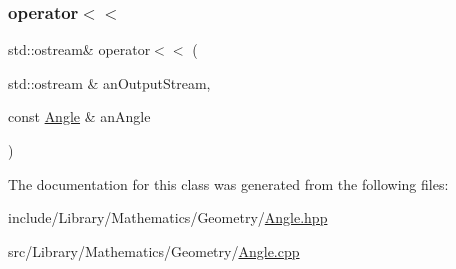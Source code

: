 \subsubsection{\texorpdfstring{operator$<$$<$}{operator<<}}
{\footnotesize\ttfamily std\+::ostream\& operator$<$$<$ (\begin{DoxyParamCaption}\item[{std\+::ostream \&}]{an\+Output\+Stream,  }\item[{const \hyperlink{classlibrary_1_1math_1_1geom_1_1_angle}{Angle} \&}]{an\+Angle }\end{DoxyParamCaption})\hspace{0.3cm}{\ttfamily [friend]}}



The documentation for this class was generated from the following files\+:\begin{DoxyCompactItemize}
\item 
include/\+Library/\+Mathematics/\+Geometry/\hyperlink{_angle_8hpp}{Angle.\+hpp}\item 
src/\+Library/\+Mathematics/\+Geometry/\hyperlink{_angle_8cpp}{Angle.\+cpp}\end{DoxyCompactItemize}
